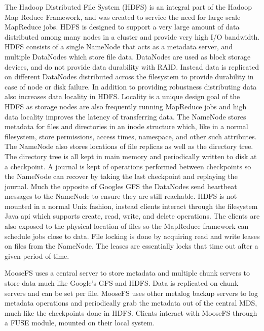 The Hadoop Distributed File System (HDFS) \cite{Shvachko2010} is an integral
part of the Hadoop Map Reduce Framework, and was created to service the need
for large scale MapReduce jobs. HDFS is designed to support a very large
amount of data distributed among many nodes in a cluster and provide very high
I/O bandwidth. HDFS consists of a single NameNode that acts as a metadata
server, and multiple DataNodes which store file data. DataNodes are used as
block storage devices, and do not provide data durability with RAID. Instead
data is replicated on different DataNodes distributed across the filesystem to
provide durability in case of node or disk failure. In addition to providing
robustness distributing data also increases data locality in HDFS. Locality is
a unique design goal of the HDFS as storage nodes are also frequently running
MapReduce jobs and high data locality improves the latency of transferring
data. The NameNode stores metadata for files and directories in an inode
structure which, like in a normal filesystem, store permissions, access times,
namespace, and other such attributes. The NameNode also stores locations of
file replicas as well as the directory tree. The directory tree is all kept in
main memory and periodically written to disk at a checkpoint. A journal is
kept of operations performed between checkpoints so the NameNode can recover
by taking the last checkpoint and replaying the journal. Much the opposite of
Googles GFS the DataNodes send heartbeat messages to the NameNode to ensure
they are still reachable. HDFS is not mounted in a normal Unix fashion,
instead clients interact through the filesystem Java api which supports
create, read, write, and delete operations. The clients are also exposed to
the physical location of files so the MapReduce framework can schedule jobs
close to data. File locking is done by acquiring read and write leases on
files from the NameNode. The leases are essentially locks that time out after
a given period of time.


MooseFS \cite{CoreTechnologyDevelopmentandSupportTeam2014} uses a central
server to store metadata and multiple chunk servers to store data much like
Google's GFS and HDFS.  Data is replicated on chunk servers and can be set per
file. MooseFS uses other metalog backup servers to log metadata operations and
periodically grab the metadata out of the central MDS, much like the
checkpoints done in HDFS. Clients interact with MooseFS through a FUSE module,
mounted on their local system.




